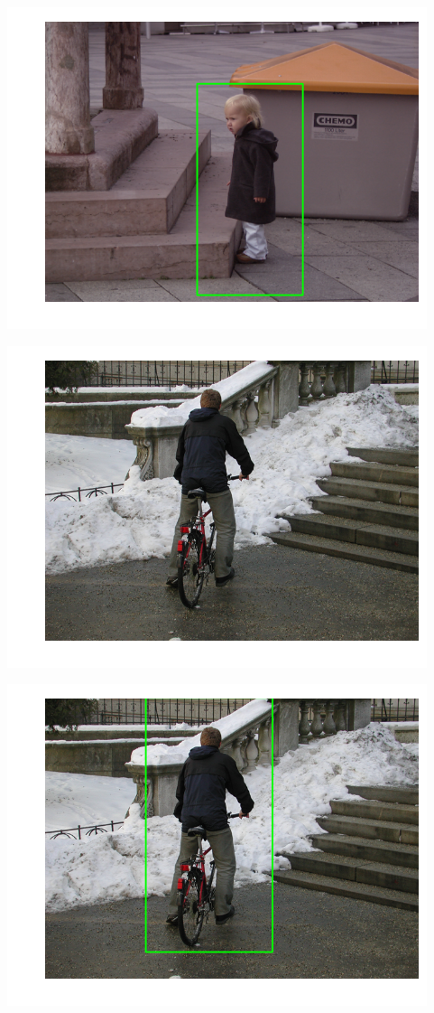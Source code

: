 \includegraphics{facedetection_files/facedetection_62_3.png}

\includegraphics{facedetection_files/facedetection_62_4.png}

\includegraphics{facedetection_files/facedetection_62_5.png}

